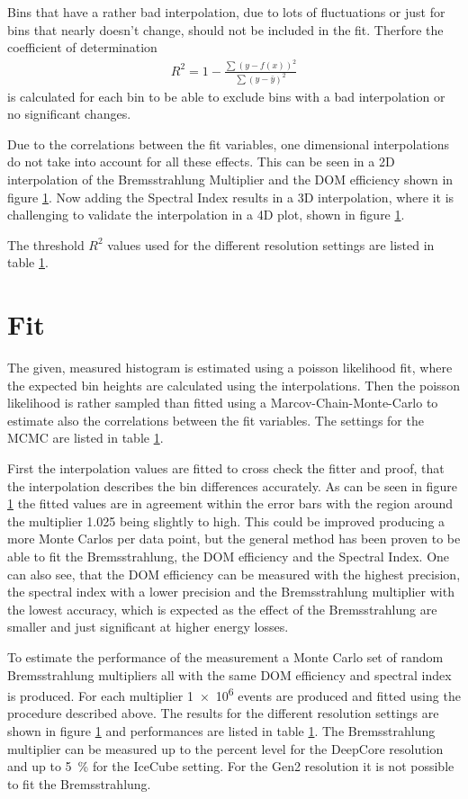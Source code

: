 Bins that have a rather bad interpolation, due to lots of fluctuations or just for bins that nearly doesn't change, should not be included in the fit.
Therfore the coefficient of determination
\begin{align}
    R^2 = 1 - \frac{\sum (y - f(x))^2}{\sum (y - \bar{y})^2}
\end{align}
is calculated for each bin to be able to exclude bins with a bad interpolation or no significant changes.

Due to the correlations between the fit variables, one dimensional interpolations do not take into account for all these effects.
This can be seen in a 2D interpolation of the Bremsstrahlung Multiplier and the DOM efficiency shown in figure \ref{}.
Now adding the Spectral Index results in a 3D interpolation, where it is challenging to validate the interpolation in a 4D plot, shown in figure \ref{}.

The threshold $R^2$ values used for the different resolution settings are listed in table \ref{}.

\section{Fit}

The given, measured histogram is estimated using a poisson likelihood fit, where the expected bin heights are calculated using the interpolations.
Then the poisson likelihood is rather sampled than fitted using a Marcov-Chain-Monte-Carlo to estimate also the correlations between the fit variables.
The settings for the MCMC are listed in table \ref{}.

First the interpolation values are fitted to cross check the fitter and proof, that the interpolation describes the bin differences accurately.
As can be seen in figure \ref{} the fitted values are in agreement within the error bars with the region around the multiplier \num{1.025} being slightly to high.
This could be improved producing a more Monte Carlos per data point, but the general method has been proven to be able to fit the Bremsstrahlung, the DOM efficiency and the Spectral Index.
One can also see, that the DOM efficiency can be measured with the highest precision, the spectral index with a lower precision and the Bremsstrahlung multiplier with the lowest accuracy, which is expected as the effect of the Bremsstrahlung are smaller and just significant at higher energy losses.

To estimate the performance of the measurement a Monte Carlo set of random Bremsstrahlung multipliers all with the same DOM efficiency and spectral index is produced.
For each multiplier \num{1e6} events are produced and fitted using the procedure described above.
The results for the different resolution settings are shown in figure \ref{} and performances are listed in table \ref{}.
The Bremsstrahlung multiplier can be measured up to the percent level for the DeepCore resolution and up to \SI{5}{\percent} for the IceCube setting.
For the Gen2 resolution it is not possible to fit the Bremsstrahlung.

